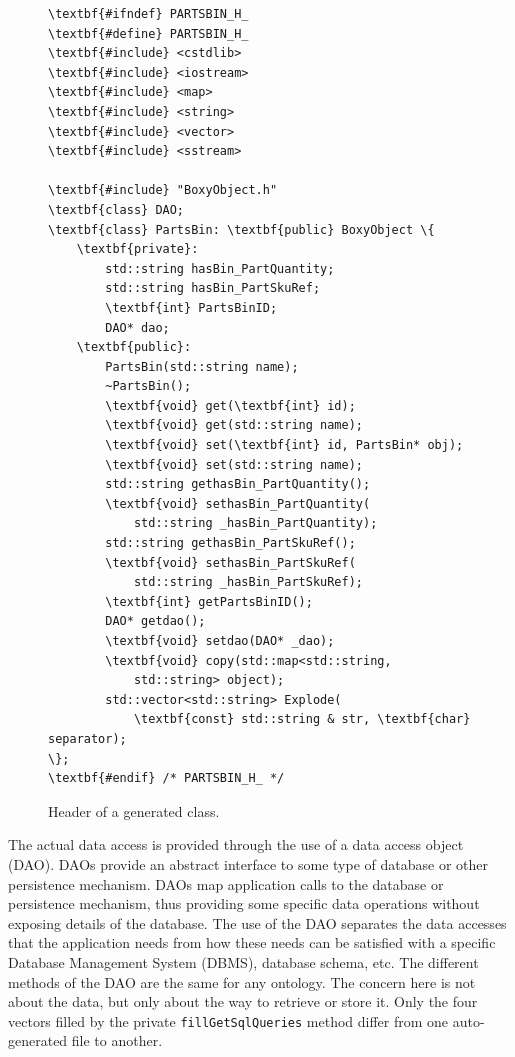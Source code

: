 \begin{figure}[t!h!]
\begin{minipage}{.5\paperwidth}
\begin{mylisting}
\begin{Verbatim}[commandchars=\\\{\},fontsize=\scriptsize, numbersep=2pt]
\textbf{#ifndef} PARTSBIN_H_
\textbf{#define} PARTSBIN_H_
\textbf{#include} <cstdlib>
\textbf{#include} <iostream>
\textbf{#include} <map>
\textbf{#include} <string>
\textbf{#include} <vector>
\textbf{#include} <sstream>

\textbf{#include} "BoxyObject.h"
\textbf{class} DAO;
\textbf{class} PartsBin: \textbf{public} BoxyObject \{
    \textbf{private}:
        std::string hasBin_PartQuantity;
        std::string hasBin_PartSkuRef;
        \textbf{int} PartsBinID;
        DAO* dao;
    \textbf{public}:
        PartsBin(std::string name);
        ~PartsBin();
        \textbf{void} get(\textbf{int} id);
        \textbf{void} get(std::string name);
        \textbf{void} set(\textbf{int} id, PartsBin* obj);
        \textbf{void} set(std::string name);
        std::string gethasBin_PartQuantity();
        \textbf{void} sethasBin_PartQuantity(
            std::string _hasBin_PartQuantity);
        std::string gethasBin_PartSkuRef();
        \textbf{void} sethasBin_PartSkuRef(
            std::string _hasBin_PartSkuRef);
        \textbf{int} getPartsBinID();
        DAO* getdao();
        \textbf{void} setdao(DAO* _dao);
        \textbf{void} copy(std::map<std::string,
            std::string> object);
        std::vector<std::string> Explode(
            \textbf{const} std::string & str, \textbf{char} separator);
\};
\textbf{#endif} /* PARTSBIN_H_ */
\end{Verbatim}
\end{mylisting}
\end{minipage}
\caption{Header of a generated class.}
\label{fig:headerclass}
\end{figure}

The actual data access is provided through the use of a data access object (DAO).
DAOs provide an abstract interface to some type of database or other persistence
mechanism. DAOs map application calls to the database or persistence mechanism, 
thus providing some specific data operations without exposing
details of the database. The use of the DAO separates the data accesses that the application needs from how these needs can be satisfied with a specific
Database Management System (DBMS), database schema, etc. 
The different methods of the DAO are the same for any ontology. 
The concern here is not about the data, but only about the way to retrieve or store it. Only the four vectors filled by the
private \texttt{fillGetSqlQueries} method differ from one 
auto-generated {\cpp} file to another.


